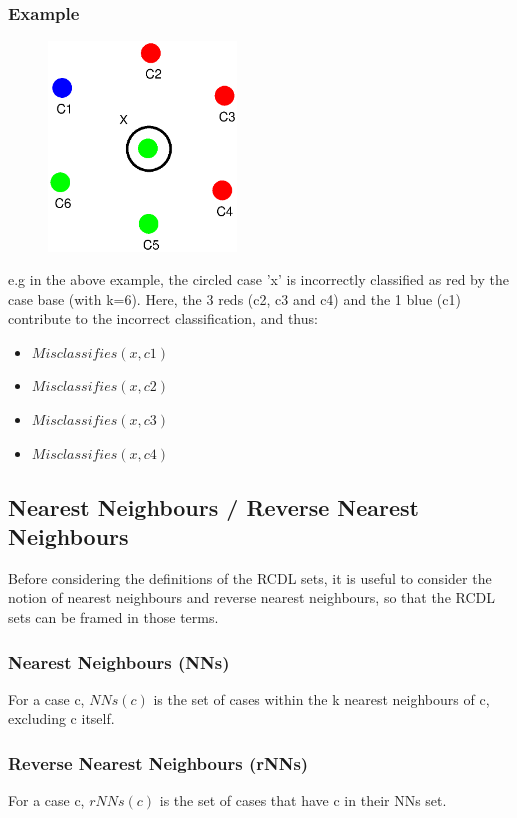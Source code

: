 \documentclass[a4paper,11pt]{report}
\begin{document}
\subsubsection{Example}
\begin{figure}[h!]
\includegraphics[width=5cm]{./Drawn/EqualDistanceMisclassifiesEg}
\end{figure}

e.g  in the above example, the circled case 'x' is incorrectly classified as red by the case base (with k=6). Here, the 3 reds (c2, c3 and c4) and the 1 blue (c1) contribute to the incorrect classification, and thus:
\begin{itemize}
	\item $ Misclassifies(x, c1) $
	\item $ Misclassifies(x, c2) $
	\item $ Misclassifies(x, c3) $
	\item $ Misclassifies(x, c4) $
\end{itemize}

\subsection{Nearest Neighbours / Reverse Nearest Neighbours}
Before considering the definitions of the RCDL sets, it is useful to consider the notion of nearest neighbours and reverse nearest neighbours, so that the RCDL sets can be framed in those terms.

\subsubsection{Nearest Neighbours (NNs)}
For a case c, $ NNs(c) $ is the set of cases within the k nearest neighbours of c, excluding c itself.

\subsubsection{Reverse Nearest Neighbours (rNNs)}
For a case c, $ rNNs(c) $ is the set of cases that have c in their NNs set.
\end{document}
